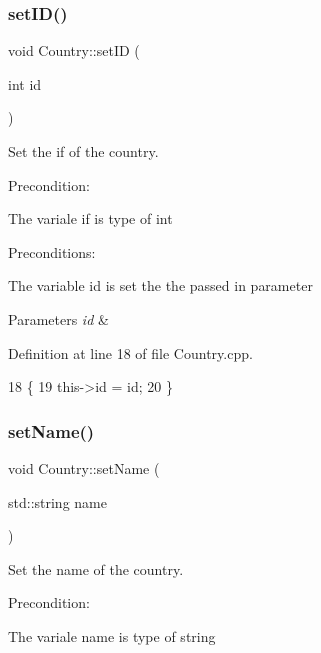 \subsubsection{\texorpdfstring{set\+I\+D()}{setID()}}
{\footnotesize\ttfamily void Country\+::set\+ID (\begin{DoxyParamCaption}\item[{int}]{id }\end{DoxyParamCaption})}



Set the if of the country. 

Precondition\+:
\begin{DoxyItemize}
\item The variale if is type of int
\end{DoxyItemize}

Preconditions\+:
\begin{DoxyItemize}
\item The variable id is set the the passed in parameter 
\begin{DoxyParams}{Parameters}
{\em id} & \\
\hline
\end{DoxyParams}

\end{DoxyItemize}

Definition at line 18 of file Country.\+cpp.


\begin{DoxyCode}
18                          \{
19     this->\textcolor{keywordtype}{id} = id;
20 \}
\end{DoxyCode}
\mbox{\label{classCountry_ae4773ebfffe4f9d2d2db1b54181b67ab}} 
\subsubsection{\texorpdfstring{set\+Name()}{setName()}}
{\footnotesize\ttfamily void Country\+::set\+Name (\begin{DoxyParamCaption}\item[{std\+::string}]{name }\end{DoxyParamCaption})}



Set the name of the country. 

Precondition\+:
\begin{DoxyItemize}
\item The variale name is type of string
\end{DoxyItemize}

